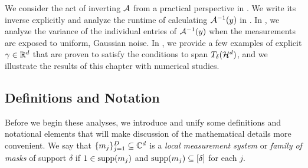 

We consider the act of inverting $\mathcal{A}$ from a practical perspective in .  We write its inverse explicitly and analyze the runtime of calculating $\mathcal{A}^{-1}(y)$ in .  In , we analyze the variance of the individual entries of $\mathcal{A}^{-1}(y)$ when the measurements are exposed to uniform, Gaussian noise.  In , we provide a few examples of explicit $\gamma \in \mathbb{R}^d$ that are proven to satisfy the conditions to span $T_\delta(\mathcal{H}^d)$, and we illustrate the results of this chapter with numerical studies.

\subsection{Definitions and Notation}
Before we begin these analyses, we introduce and unify some definitions and notational elements that will make discussion of the mathematical details more convenient.  We say that $\{m_j\}_{j = 1}^D \subseteq \mathbb{C}^d$ is a \emph{local measurement system} or \emph{family of masks} of support $\delta$ if $1 \in \operatorname{supp}(m_j)$ and $\operatorname{supp}(m_j) \subseteq [\delta]$ for each $j$.  

